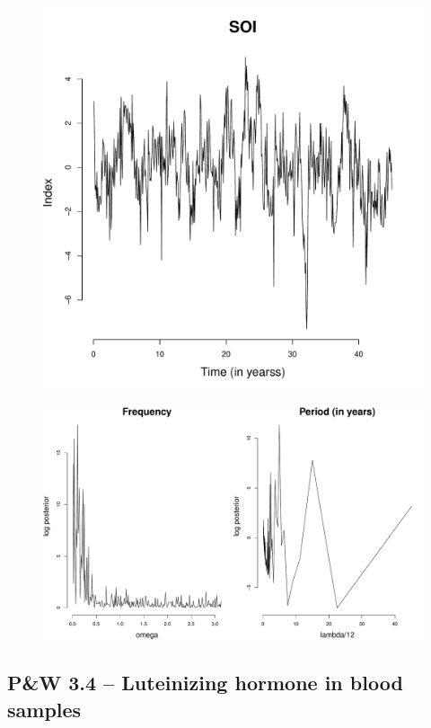 \documentclass[12pt]{article}
\begin{document}
\begin{figure}[H]
\begin{center}
\includegraphics[scale=0.40]{dat_soi.pdf}
\end{center}
\end{figure}

\begin{figure}[H]
\begin{center}
\includegraphics[scale=0.40]{fp_soi.pdf}
\end{center}
\end{figure}

\subsection*{P\&W 3.4 -- Luteinizing hormone in blood samples}
\end{document}
